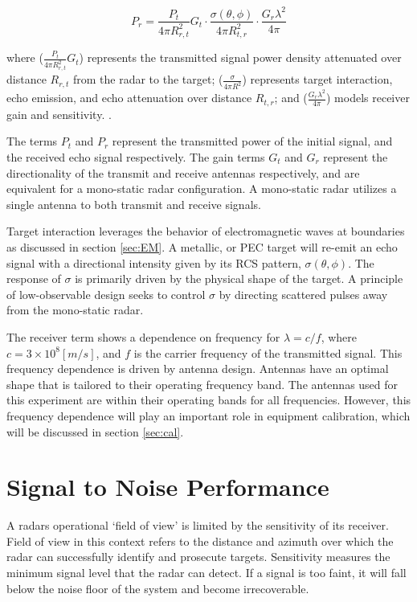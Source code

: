 		\begin{equation}\label{eq:re}
			P_{r} = \frac{P_t}{4 \pi R_{r, t}^2}G_t \cdot \frac{\sigma(\theta, \phi)}{4 \pi R_{t, r}^2} \cdot \frac{G_r \lambda^2}{4 \pi}
		\end{equation}

		where  ($\frac{P_t }{4 \pi R_{r, t}^2}G_t$) represents the transmitted signal power density attenuated over distance $R_{r, t}$ from the radar to the target; ($\frac{\sigma}{4 \pi R^2}$) represents target interaction, echo emission, and echo attenuation over distance $R_{t, r}$; and ($\frac{G_r \lambda^2}{4 \pi}$) models receiver gain and sensitivity. \cite{POMR_Range_eq}.

		The terms $P_t$ and $P_r$ represent the transmitted power of the initial signal, and the received echo signal respectively. The gain terms $G_t$ and $G_r$ represent the directionality of the transmit and receive antennas respectively, and are equivalent for a mono-static radar configuration. A mono-static radar utilizes a single antenna to both transmit and receive signals.

		Target interaction leverages the behavior of electromagnetic waves at boundaries as discussed in section \ref{sec:EM}. A metallic, or PEC target will re-emit an echo signal with a directional intensity given by its RCS pattern, $\sigma(\theta, \phi)$. The response of $\sigma$ is primarily driven by the physical shape of the target. A principle of low-observable design seeks to control $\sigma$ by directing scattered pulses away from the mono-static radar.

		The receiver term shows a dependence on frequency for $\lambda = c/f$, where $c = 3\times 10^8 [m/s]$, and $f$ is the carrier frequency of the transmitted signal. This frequency dependence is driven by antenna design. Antennas have an optimal shape that is tailored to their operating frequency band. The antennas used for this experiment are within their operating bands for all frequencies. However, this frequency dependence will play an important role in equipment calibration, which will be discussed in section \ref{sec:cal}.

\section{Signal to Noise Performance}

	A radars operational `field of view' is limited by the sensitivity of its receiver. Field of view in this context refers to the distance and azimuth over which the radar can successfully identify and prosecute targets. Sensitivity measures the minimum signal level that the radar can detect. If a signal is too faint, it will fall below the noise floor of the system  and become irrecoverable.

